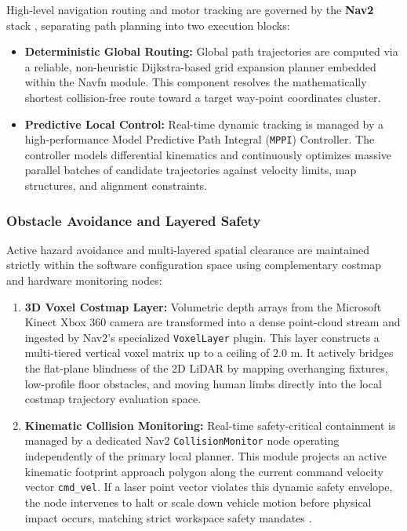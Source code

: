 \documentclass[12pt,a4paper]{report}
\begin{document}
High-level navigation routing and motor tracking are governed by the \textbf{Nav2} stack \cite{nav2}, separating path planning into two execution blocks:
\begin{itemize}[leftmargin=*,itemsep=2pt]
    \item \textbf{Deterministic Global Routing:} Global path trajectories are computed via a reliable, non-heuristic Dijkstra-based grid expansion planner embedded within the Navfn module. This component resolves the mathematically shortest collision-free route toward a target way-point coordinates cluster.
    \item \textbf{Predictive Local Control:} Real-time dynamic tracking is managed by a high-performance Model Predictive Path Integral (\texttt{MPPI}) Controller. The controller models differential kinematics and continuously optimizes massive parallel batches of candidate trajectories against velocity limits, map structures, and alignment constraints.
\end{itemize}

\subsubsection{Obstacle Avoidance and Layered Safety}
Active hazard avoidance and multi-layered spatial clearance are maintained strictly within the software configuration space using complementary costmap and hardware monitoring nodes:
\begin{enumerate}[leftmargin=*,itemsep=2pt]
    \item \textbf{3D Voxel Costmap Layer:} Volumetric depth arrays from the Microsoft Kinect Xbox 360 camera are transformed into a dense point-cloud stream and ingested by Nav2's specialized \texttt{VoxelLayer} plugin. This layer constructs a multi-tiered vertical voxel matrix up to a ceiling of $2.0\text{ m}$. It actively bridges the flat-plane blindness of the 2D LiDAR by mapping overhanging fixtures, low-profile floor obstacles, and moving human limbs directly into the local costmap trajectory evaluation space.
    \item \textbf{Kinematic Collision Monitoring:} Real-time safety-critical containment is managed by a dedicated Nav2 \texttt{CollisionMonitor} node operating independently of the primary local planner. This module projects an active kinematic footprint approach polygon along the current command velocity vector \texttt{cmd\_vel}. 
    If a laser point vector violates this dynamic safety envelope, the node intervenes to halt or scale down vehicle motion before physical impact occurs, matching strict workspace safety mandates \cite{iso13482,iso3691_4}.
    
\end{enumerate}
\end{document}

